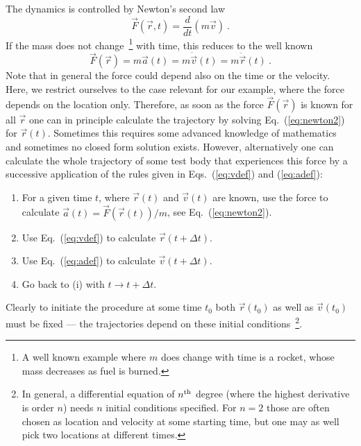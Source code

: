 \documentclass[12pt,ngerman,american]{iopart}
\begin{document}
The dynamics is controlled by Newton's second law
\begin{equation}
\vec F(\vec r, t) = \frac{d}{dt}(m \vec v) \ .
\end{equation}
If the mass does not change~\footnote{%
	A well known example where $m$ does change with time is a rocket, whose mass decreases as fuel is burned.
} with time, this reduces to the well known
\begin{equation}
\vec F(\vec r) = m \vec a(t) = m\dot{\vec v}(t) = m\ddot{\vec{r}}(t) \ . \label{eq:newton2}
\end{equation}
Note that in general the force could depend also on the time or the velocity.
Here, we restrict ourselves to the case relevant for our example, where the force depends on the location only.
Therefore, as soon as the force $\vec F(\vec r)$ is known for all $\vec r$ one can in principle calculate the trajectory by solving Eq.~(\ref{eq:newton2}) for $\vec r(t)$.
Sometimes this requires some advanced knowledge of mathematics and sometimes no closed form solution exists.
However, alternatively one can calculate the whole trajectory of some test body that experiences this force by a successive application of the rules given in Eqs.~(\ref{eq:vdef}) and (\ref{eq:adef}):
\begin{enumerate}
\item For a given time $t$, where $\vec r(t)$ and $\vec v(t)$ are known, use the force to calculate $\vec a(t) = \vec F(\vec r(t)) / m$, see Eq.~(\ref{eq:newton2}).
\item Use Eq.~(\ref{eq:vdef}) to calculate $\vec r(t+\Delta t)$.
\item Use Eq.~(\ref{eq:adef}) to calculate $\vec v(t+\Delta t)$.
\item Go back to (i) with $t\to t+\Delta t$.
\end{enumerate}
Clearly to initiate the procedure at some time $t_0$ both $\vec r(t_0)$ as well as $\vec v(t_0)$ must be fixed --- the  trajectories depend on these initial conditions~\footnote{%
	In general, a differential equation of $n^{\rm th}$ degree (where the highest derivative is order $n$) needs $n$ initial conditions specified.
	For $n=2$ those are often chosen as location and velocity at some starting time, but one may as well pick two locations at different times.%
}.
\end{document}
